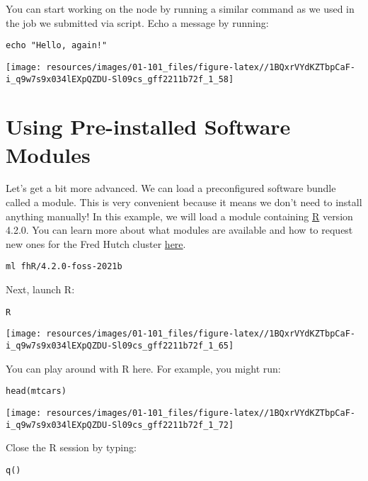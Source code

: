 \documentclass[
]{book}
\begin{document}
You can start working on the node by running a similar command as we used in the job we submitted via script. Echo a message by running:

\begin{verbatim}
echo "Hello, again!"
\end{verbatim}

\texttt{[image: resources/images/01-101\_files/figure-latex//1BQxrVYdKZTbpCaF-i\_q9w7s9x034lEXpQZDU-Sl09cs\_gff2211b72f\_1\_58]}

\hypertarget{using-pre-installed-software-modules}{%
\section{Using Pre-installed Software Modules}\label{using-pre-installed-software-modules}}

Let's get a bit more advanced. We can load a preconfigured software bundle called a module. This is very convenient because it means we don't need to install anything manually! In this example, we will load a module containing \href{https://www.r-project.org/}{R} version 4.2.0. You can learn more about what modules are available and how to request new ones for the Fred Hutch cluster \href{https://sciwiki.fredhutch.org/scicomputing/compute_scientificSoftware/}{here}.

\begin{verbatim}
ml fhR/4.2.0-foss-2021b
\end{verbatim}

Next, launch R:

\begin{verbatim}
R
\end{verbatim}

\texttt{[image: resources/images/01-101\_files/figure-latex//1BQxrVYdKZTbpCaF-i\_q9w7s9x034lEXpQZDU-Sl09cs\_gff2211b72f\_1\_65]}

You can play around with R here. For example, you might run:

\begin{verbatim}
head(mtcars)
\end{verbatim}

\texttt{[image: resources/images/01-101\_files/figure-latex//1BQxrVYdKZTbpCaF-i\_q9w7s9x034lEXpQZDU-Sl09cs\_gff2211b72f\_1\_72]}

Close the R session by typing:

\begin{verbatim}
q()
\end{verbatim}
\end{document}
